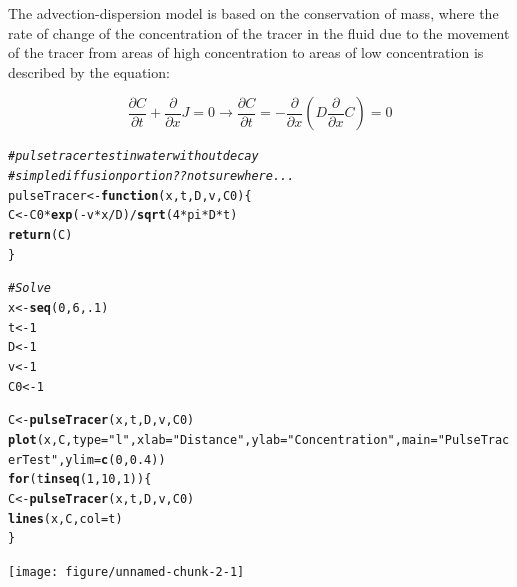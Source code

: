 \documentclass{tufte-handout}\usepackage[]{graphicx}\usepackage[]{xcolor}
\makeatletter
\newcommand{\hlnum}[1]{\textcolor[rgb]{0.686,0.059,0.569}{#1}}%
\newcommand{\hlstr}[1]{\textcolor[rgb]{0.192,0.494,0.8}{#1}}%
\newcommand{\hlcom}[1]{\textcolor[rgb]{0.678,0.584,0.686}{\textit{#1}}}%
\newcommand{\hlopt}[1]{\textcolor[rgb]{0,0,0}{#1}}%
\newcommand{\hlstd}[1]{\textcolor[rgb]{0.345,0.345,0.345}{#1}}%
\newcommand{\hlkwa}[1]{\textcolor[rgb]{0.161,0.373,0.58}{\textbf{#1}}}%
\newcommand{\hlkwb}[1]{\textcolor[rgb]{0.69,0.353,0.396}{#1}}%
\newcommand{\hlkwc}[1]{\textcolor[rgb]{0.333,0.667,0.333}{#1}}%
\newcommand{\hlkwd}[1]{\textcolor[rgb]{0.737,0.353,0.396}{\textbf{#1}}}%
\newenvironment{kframe}{%
 \def\at@end@of@kframe{}%
 \ifinner\ifhmode%
  \def\at@end@of@kframe{\end{minipage}}%
  \begin{minipage}{\columnwidth}%
 \fi\fi%
 \def\FrameCommand##1{\hskip\@totalleftmargin \hskip-\fboxsep
 \colorbox{shadecolor}{##1}\hskip-\fboxsep
     \hskip-\linewidth \hskip-\@totalleftmargin \hskip\columnwidth}%
 \MakeFramed {\advance\hsize-\width
   \@totalleftmargin\z@ \linewidth\hsize
   \@setminipage}}%
 {\par\unskip\endMakeFramed%
 \at@end@of@kframe}
\newenvironment{knitrout}{}{} %
\makeatother
\begin{document}
The advection-dispersion model is based on the conservation of mass, where the rate of change of the concentration of the tracer in the fluid due to the movement of the tracer from areas of high concentration to areas of low concentration is described by the equation:

\begin{equation}
  \frac{\partial C}{\partial t} + \frac{\partial}{\partial x} J = 0 \rightarrow  \frac{\partial C}{\partial t} = - \frac{\partial}{\partial x}( D \frac{\partial}{\partial x} C) = 0
\end{equation}

\begin{knitrout}
\color{fgcolor}\begin{kframe}
\begin{alltt}
\hlcom{# pulse tracer test in water without decay}
\hlcom{# simple diffusion portion?? not sure where...}
\hlstd{pulseTracer} \hlkwb{<-} \hlkwa{function}\hlstd{(}\hlkwc{x}\hlstd{,} \hlkwc{t}\hlstd{,} \hlkwc{D}\hlstd{,} \hlkwc{v}\hlstd{,} \hlkwc{C0}\hlstd{) \{}
  \hlstd{C} \hlkwb{<-} \hlstd{C0} \hlopt{*} \hlkwd{exp}\hlstd{(}\hlopt{-}\hlstd{v} \hlopt{*} \hlstd{x} \hlopt{/} \hlstd{D)} \hlopt{/} \hlkwd{sqrt}\hlstd{(}\hlnum{4} \hlopt{*} \hlstd{pi} \hlopt{*} \hlstd{D} \hlopt{*} \hlstd{t)}
  \hlkwd{return}\hlstd{(C)}
\hlstd{\}}

\hlcom{# Solve}
\hlstd{x} \hlkwb{<-} \hlkwd{seq}\hlstd{(}\hlnum{0}\hlstd{,} \hlnum{6}\hlstd{,} \hlnum{.1}\hlstd{)}
\hlstd{t} \hlkwb{<-} \hlnum{1}
\hlstd{D} \hlkwb{<-} \hlnum{1}
\hlstd{v} \hlkwb{<-} \hlnum{1}
\hlstd{C0} \hlkwb{<-} \hlnum{1}



\hlstd{C} \hlkwb{<-} \hlkwd{pulseTracer}\hlstd{(x, t, D, v, C0)}
\hlkwd{plot}\hlstd{(x, C,} \hlkwc{type} \hlstd{=} \hlstr{"l"}\hlstd{,} \hlkwc{xlab} \hlstd{=} \hlstr{"Distance"}\hlstd{,} \hlkwc{ylab} \hlstd{=} \hlstr{"Concentration"}\hlstd{,} \hlkwc{main} \hlstd{=} \hlstr{"Pulse Tracer Test"}\hlstd{,} \hlkwc{ylim}\hlstd{=}\hlkwd{c}\hlstd{(}\hlnum{0}\hlstd{,} \hlnum{0.4}\hlstd{))}
\hlkwa{for}\hlstd{(t} \hlkwa{in} \hlkwd{seq}\hlstd{(}\hlnum{1}\hlstd{,} \hlnum{10}\hlstd{,} \hlnum{1}\hlstd{)) \{}
  \hlstd{C} \hlkwb{<-} \hlkwd{pulseTracer}\hlstd{(x, t, D, v, C0)}
  \hlkwd{lines}\hlstd{(x, C,} \hlkwc{col} \hlstd{= t)}
\hlstd{\}}
\end{alltt}
\end{kframe}
\texttt{[image: figure/unnamed-chunk-2-1]} 
\end{knitrout}
\end{document}
